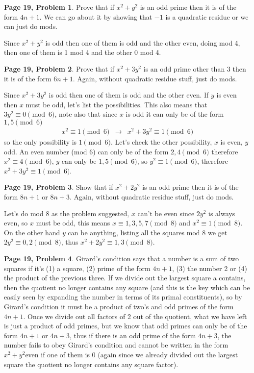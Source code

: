 \documentclass[aps,preprint,preprintnumbers,nofootinbib,showpacs,prd]{revtex4-1}
\newcommand{\nbea}{\begin{eqnarray*}}
\newcommand{\neea}{\end{eqnarray*}}
\begin{document}
{\bf Page 19, Problem 1}. Prove that if $x^2 + y^2$ is an odd prime then it is of the form $4n + 1$. We can go about it by showing that $-1$ is a quadratic residue or we can just do mods.

Since $x^2 + y^2$ is odd then one of them is odd and the other even, doing mod 4, then one of them is 1 mod 4 and the other 0 mod 4.

{\bf Page 19, Problem 2}. Prove that if $x^2 + 3y^2$ is an odd prime other than 3 then it is of the form $6n + 1$. Again, without quadratic residue stuff, just do mods. 

Since $x^2 + 3y^2$ is odd then one of them is odd and the other even. If $y$ is even then $x$ must be odd, let's list the possibilities. This also means that $3y^2 \equiv 0 \pmod{6}$, note also that since $x$ is odd it can only be of the form $1,5 \pmod{6}$
%
\nbea
x^2 \equiv 1 \pmod{6} & \to & x^2 + 3y^2 \equiv 1 \pmod{6}
\neea
%
so the only possibility is $1 \pmod{6}$. Let's check the other possibility, $x$ is even, $y$ odd. An even number (mod 6) can only be of the form $2,4 \pmod{6}$ therefore $x^2 \equiv 4 \pmod{6}$, $y$ can only be $1,5 \pmod{6}$, so $y^2 \equiv 1 \pmod{6}$, therefore $x^2 + 3y^2 \equiv 1 \pmod{6}$.

{\bf Page 19, Problem 3}. Show that if $x^2 + 2y^2$ is an odd prime then it is of the form $8n + 1$ or $8n + 3$. Again, without quadratic residue stuff, just do mods.

Let's do mod 8 as the problem suggested, $x$ can't be even since $2y^2$ is always even, so $x$ must be odd, this means $x \equiv 1,3,5,7 \pmod{8}$ and $x^2 \equiv 1 \pmod{8}$. On the other hand $y$ can be anything, listing all the squares mod 8 we get $2y^2 \equiv 0,2 \pmod{8}$, thus $x^2 + 2y^2 \equiv 1,3 \pmod{8}$.

{\bf Page 19, Problem 4}. Girard's condition says that a number is a sum of two squares if it's (1) a square, (2) prime of the form $4n + 1$, (3) the number 2 or (4) the product of the previous three. If we divide out the largest square a contains, then the quotient no longer contains any square (and this is the key which can be easily seen by expanding the number in terms of its primal constituents), so by Girard's condition it must be a product of two's and odd primes of the form $4n + 1$. Once we divide out all factors of 2 out of the quotient, what we have left is just a product of odd primes, but we know that odd primes can only be of the form $4n+1$ or $4n+3$, thus if there is an odd prime of the form $4n + 3$, the number fails to obey Girard's condition and cannot be written in the form $x^2 + y^2$even if one of them is 0 (again since we already divided out the largest square the quotient no longer contains any square factor).
\end{document}
